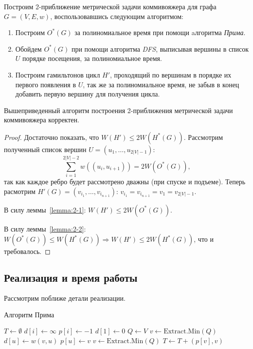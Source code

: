 Построим 2-приближение метрической задачи коммивояжера для графа $G = (V, E, w)$, воспользовавшись следующим алгоритмом:
\begin{enumerate}[label=\arabic*.]
    \item Построим $O^*(G)$ за полиномиальное время при помощи aлгоритма \textit{Прима}.
    \item Обойдем $O^*(G)$ при помощи алгоритма \textit{DFS}, выписывая вершины в список $U$ порядке посещения, за полиномиальное время.
    \item Построим гамильтонов цикл $H'$, проходящий по вершинам в порядке их первого появления в $U$, так же за полиномиальное время,
          не забыв в конец добавить первую вершину для получения цикла.
\end{enumerate}

\begin{theorem}
    \label{theorem:2-1}
    Вышеприведенный алгоритм построения 2-приближения метрической задачи коммивояжера корректен.
\end{theorem}
\begin{proof}
    Достаточно показать, что $W(H') \leq 2 W(H^*(G))$. Рассмотрим полученный список вершин $U = (u_1, \dots, u_{2|V|-1})$:
    $$\sum\limits_{i=1}^{2|V|-2} w((u_i, u_{i+1})) = 2 W(O^*(G)),$$
    так как каждое ребро будет рассмотрено дважны (при спуске и подъеме).
    Теперь расмотрим $H'(G) = (v_{i_1}, \dots, v_{i_{n+1}}): \, v_{i_1} = v_{i_{n+1}} = v_1 = v_{2|V|-1}$.

    В силу леммы~\ref{lemma:2-1}: $W(H') \leq 2 W(O^*(G))$.

    В силу леммы~\ref{lemma:2-2}: $W(O^*(G)) \leq W(H^*(G)) \Rightarrow W(H') \leq 2 W(H^*(G))$, что и требовалось.
\end{proof}

\subsection*{Реализация и время работы}

Рассмотрим поближе детали реализации.

\begin{algorithm}[H]
    \caption{Алгоритм Прима}
    \begin{algorithmic}[1]
        \State $T \gets \emptyset$
        \State $d[i] \gets \infty$
        \State $p[i] \gets -1$
        \EndFor
        \State $d[1] \gets 0$
        \State $Q \gets V$
        \State $v \gets \text{Extract.Min}(Q)$
        \State $d[u] \gets w(v, u)$
        \State $p[u] \gets v$
        \EndIf
        \EndFor
        \State $v \gets \text{Extract.Min}(Q)$
        \State $T \gets T + (p[v], v)$
        \EndWhile
    \end{algorithmic}
\end{algorithm}

